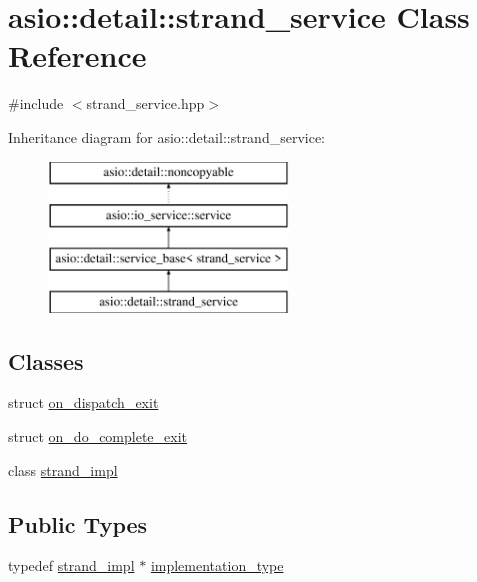 \hypertarget{classasio_1_1detail_1_1strand__service}{}\section{asio\+:\+:detail\+:\+:strand\+\_\+service Class Reference}
\label{classasio_1_1detail_1_1strand__service}


{\ttfamily \#include $<$strand\+\_\+service.\+hpp$>$}

Inheritance diagram for asio\+:\+:detail\+:\+:strand\+\_\+service\+:\begin{figure}[H]
\begin{center}
\leavevmode
\includegraphics[height=4.000000cm]{classasio_1_1detail_1_1strand__service}
\end{center}
\end{figure}
\subsection*{Classes}
\begin{DoxyCompactItemize}
\item 
struct \hyperlink{structasio_1_1detail_1_1strand__service_1_1on__dispatch__exit}{on\+\_\+dispatch\+\_\+exit}
\item 
struct \hyperlink{structasio_1_1detail_1_1strand__service_1_1on__do__complete__exit}{on\+\_\+do\+\_\+complete\+\_\+exit}
\item 
class \hyperlink{classasio_1_1detail_1_1strand__service_1_1strand__impl}{strand\+\_\+impl}
\end{DoxyCompactItemize}
\subsection*{Public Types}
\begin{DoxyCompactItemize}
\item 
typedef \hyperlink{classasio_1_1detail_1_1strand__service_1_1strand__impl}{strand\+\_\+impl} $\ast$ \hyperlink{classasio_1_1detail_1_1strand__service_ae3f87cc0ee8977c0ed0ee8e35ebe2491}{implementation\+\_\+type}
\end{DoxyCompactItemize}
